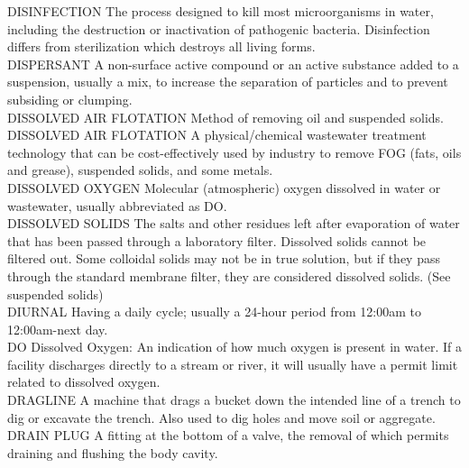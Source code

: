 DISINFECTION
The process designed to kill most microorganisms in water, including the destruction or inactivation of pathogenic bacteria. Disinfection differs from sterilization which destroys all living forms.
\vspace{0.3cm}\\
DISPERSANT
A non-surface active compound or an active substance added to a suspension, usually a mix, to increase the separation of particles and to prevent subsiding or clumping.
\vspace{0.3cm}\\
DISSOLVED AIR FLOTATION
Method of removing oil and suspended solids.
\vspace{0.3cm}\\
DISSOLVED AIR FLOTATION
A physical/chemical wastewater treatment technology that can be cost-effectively used by industry to remove FOG (fats, oils and grease), suspended solids, and some metals.
\vspace{0.3cm}\\
DISSOLVED OXYGEN
Molecular (atmospheric) oxygen dissolved in water or wastewater, usually abbreviated as DO.
\vspace{0.3cm}\\
DISSOLVED SOLIDS
The salts and other residues left after evaporation of water that has been passed through a laboratory filter. Dissolved solids cannot be filtered out. Some colloidal solids may not be in true solution, but if they pass through the standard membrane filter, they are considered dissolved solids. (See suspended solids)
\vspace{0.3cm}\\
DIURNAL
Having a daily cycle; usually a 24-hour period from 12:00am to 12:00am-next day.
\vspace{0.3cm}\\
DO
Dissolved Oxygen:  An indication of how much oxygen is present in water. If a facility discharges directly to a stream or river, it will usually have a permit limit related to dissolved oxygen.
\vspace{0.3cm}\\
DRAGLINE
A machine that drags a bucket down the intended line of a trench to dig or excavate the trench. Also used to dig holes and move soil or aggregate. 
\vspace{0.3cm}\\
DRAIN PLUG
A fitting at the bottom of a valve, the removal of which permits draining and flushing the body cavity.
\vspace{0.3cm}\\
